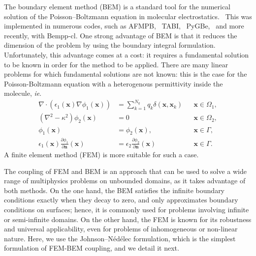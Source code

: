 
The boundary element method (BEM) is a standard tool for the numerical solution of the Poisson--Boltzmann equation in molecular electrostatics.~\cite{ZauharMorgan1985, Shaw1985} This was implemented in numerous codes, such as AFMPB,~\cite{LuETal2006} TABI,~\cite{GengKrasny2013} PyGBe,~\cite{CooperBardhanBarba2014,cooper2016pygbe} and more recently, with Bempp-cl\cite{search2022towards}. One strong advantage of BEM is that it reduces the dimension of the problem by using the boundary integral formulation. Unfortunately, this advantage comes at a cost: it requires a fundamental solution to be known in order for the method to be applied. There are many linear problems for which fundamental solutions are not known: this is the case for the Poisson-Boltzmann equation with a heterogenous permittivity inside the molecule, \emph{ie}.
%
\begin{align} \label{eq:pbe_vp}
\nabla \cdot \left(\epsilon_1(\mathbf{x}) \nabla \phi_1(\mathbf{x})\right) &= \sum_{k=1}^{N_q} q_k\delta(\mathbf{x},\mathbf{x}_k) &&\mathbf{x} \in \Omega_1,\nonumber\\
\left(\nabla^2 - \kappa^2\right)\phi_2(\mathbf{x})  &= 0 &&\mathbf{x}\in\Omega_2,\nonumber\\
\phi_1(\mathbf{x})  &= \phi_2(\mathbf{x}),&&\mathbf{x}\in \Gamma,\nonumber\\
\epsilon_1(\mathbf{x})\frac{\partial\phi_1}{\partial\mathbf{n}}(\mathbf{x})  &= \epsilon_2\frac{\partial\phi_2}{\partial\mathbf{n}}(\mathbf{x}) &&\mathbf{x}\in \Gamma. 
\end{align}
%
A finite element method (FEM) is more suitable for such a case.

The coupling of FEM and BEM is an approach that can be used to solve a wide range of multiphysics problems on unbounded domains\cite{hiptmair2002,banjai2015}, as it takes advantage of both methods. On the one hand, the BEM satisfies the infinite boundary conditions exactly when they decay to zero, and only approximates boundary conditions on surfaces; hence, it is commonly used for problems involving infinite or semi-infinite domains. On the other hand, the FEM is known for its robustness and universal applicability, even for problems of inhomogeneous or non-linear nature.
Here, we use the Johnson--N\'ed\'elec formulation,\cite{johnson1980coupling} which is the simplest formulation of FEM-BEM coupling, and we detail it next.

